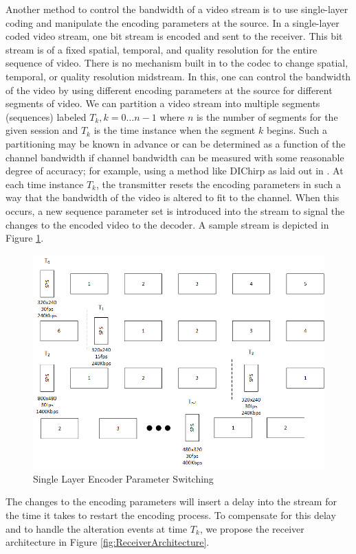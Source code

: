 \documentclass[a4paper,12pt]{article}
\begin{document}
Another method to control the bandwidth of a video stream is to use single-layer coding and manipulate the encoding parameters at the source. In a single-layer coded video stream, one bit stream is encoded and sent to the receiver. This bit stream is of a fixed spatial, temporal, and quality resolution for the entire sequence of video. There is no mechanism built in to the codec to change spatial, temporal, or quality resolution midstream. In this, one can control the bandwidth of the video by using different encoding parameters at the source for different segments of video. We can partition a video stream into multiple segments (sequences) labeled $T_k,k=0\ldots{n-1}$ where $n$ is the number of segments for the given session and $T_k$ is the time instance when the segment $k$ begins. Such a partitioning may be known in advance or can be determined as a function of the channel bandwidth if channel bandwidth can be measured with some reasonable degree of accuracy; for example, using a method like DIChirp as laid out in \cite{DIChirp}. At each time instance $T_k$, the transmitter resets the encoding parameters in such a way that the bandwidth of the video is altered to fit to the channel. When this occurs, a new sequence parameter set is introduced into the stream to signal the changes to the encoded video to the decoder. A sample stream is depicted in Figure \ref{fig:SingleLayerSwitching}.
\begin{figure}[h]
\centering
\includegraphics[width=0.8\linewidth]{SingleLayerParameterSwitching.png}
\caption{Single Layer Encoder Parameter Switching}
\label{fig:SingleLayerSwitching}
\end{figure}
The changes to the encoding parameters will insert a delay into the stream for the time it takes to restart the encoding process. To compensate for this delay and to handle the alteration events at time $T_k$, we propose the receiver architecture in Figure \ref{fig:ReceiverArchitecture}.
\end{document}
